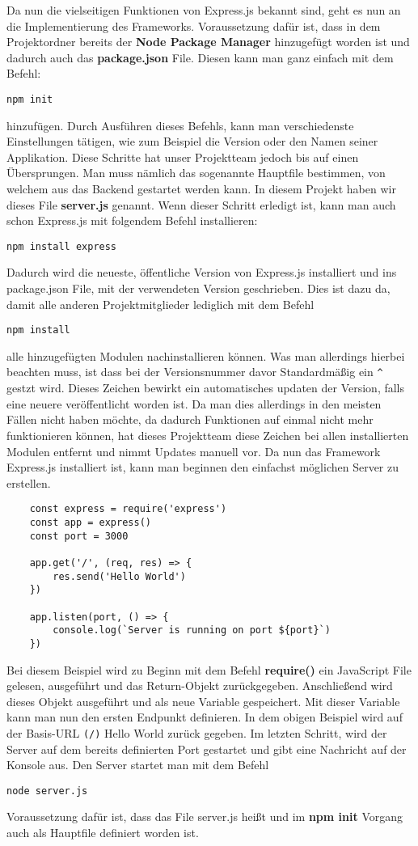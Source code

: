 Da nun die vielseitigen Funktionen von Express.js bekannt sind, geht es nun an die Implementierung des Frameworks. Voraussetzung dafür ist, dass in dem Projektordner bereits der \textbf{Node Package Manager} hinzugefügt worden ist und dadurch auch das \textbf{package.json} File. Diesen kann man ganz einfach mit dem Befehl:
\begin{verbatim}
npm init
\end{verbatim}
hinzufügen. Durch Ausführen dieses Befehls, kann man verschiedenste Einstellungen tätigen, wie zum Beispiel die Version oder den Namen seiner Applikation. Diese Schritte hat unser Projektteam jedoch bis auf einen Übersprungen. Man muss nämlich das sogenannte Hauptfile bestimmen, von welchem aus das Backend gestartet werden kann. In diesem Projekt haben wir dieses File \textbf{server.js} genannt. Wenn dieser Schritt erledigt ist, kann man auch schon Express.js mit folgendem Befehl installieren:
\begin{verbatim}
npm install express
\end{verbatim}
Dadurch wird die neueste, öffentliche Version von Express.js installiert und ins package.json File, mit der verwendeten Version geschrieben. Dies ist dazu da, damit alle anderen Projektmitglieder lediglich mit dem Befehl
\begin{verbatim}
npm install
\end{verbatim}
alle hinzugefügten Modulen nachinstallieren können. Was man allerdings hierbei beachten muss, ist dass bei der Versionsnummer davor Standardmäßig ein \verb|^| gestzt wird. Dieses Zeichen bewirkt ein automatisches updaten der Version, falls eine neuere veröffentlicht worden ist. Da man dies allerdings in den meisten Fällen nicht haben möchte, da dadurch Funktionen auf einmal nicht mehr funktionieren können, hat dieses Projektteam diese Zeichen bei allen installierten Modulen entfernt und nimmt Updates manuell vor.
\newline
Da nun das Framework Express.js installiert ist, kann man beginnen den einfachst möglichen Server zu erstellen.
\begin{lstlisting}
    const express = require('express')
    const app = express()
    const port = 3000

    app.get('/', (req, res) => {
        res.send('Hello World')
    })

    app.listen(port, () => {
        console.log(`Server is running on port ${port}`)
    })
\end{lstlisting}
Bei diesem Beispiel wird zu Beginn mit dem Befehl \textbf{require()} ein JavaScript File gelesen, ausgeführt und das Return-Objekt zurückgegeben. Anschließend wird dieses Objekt ausgeführt und als neue Variable gespeichert. Mit dieser Variable kann man nun den ersten Endpunkt definieren. In dem obigen Beispiel wird auf der Basis-URL \verb|(/)| Hello World zurück gegeben. Im letzten Schritt, wird der Server auf dem bereits definierten Port gestartet und gibt eine Nachricht auf der Konsole aus. Den Server startet man mit dem Befehl
\begin{verbatim}
node server.js
\end{verbatim}
Voraussetzung dafür ist, dass das File server.js heißt und im \textbf{npm init} Vorgang auch als Hauptfile definiert worden ist.